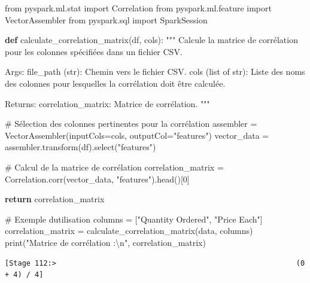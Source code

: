 \documentclass[
  letterpaper,
  DIV=11,
  numbers=noendperiod]{scrartcl}
\newenvironment{Shaded}{\begin{snugshade}}{\end{snugshade}}
\newcommand{\BuiltInTok}[1]{\textcolor[rgb]{0.00,0.23,0.31}{#1}}
\newcommand{\CharTok}[1]{\textcolor[rgb]{0.13,0.47,0.30}{#1}}
\newcommand{\CommentTok}[1]{\textcolor[rgb]{0.37,0.37,0.37}{#1}}
\newcommand{\ControlFlowTok}[1]{\textcolor[rgb]{0.00,0.23,0.31}{\textbf{#1}}}
\newcommand{\DecValTok}[1]{\textcolor[rgb]{0.68,0.00,0.00}{#1}}
\newcommand{\ImportTok}[1]{\textcolor[rgb]{0.00,0.46,0.62}{#1}}
\newcommand{\KeywordTok}[1]{\textcolor[rgb]{0.00,0.23,0.31}{\textbf{#1}}}
\newcommand{\NormalTok}[1]{\textcolor[rgb]{0.00,0.23,0.31}{#1}}
\newcommand{\OperatorTok}[1]{\textcolor[rgb]{0.37,0.37,0.37}{#1}}
\newcommand{\StringTok}[1]{\textcolor[rgb]{0.13,0.47,0.30}{#1}}
\begin{document}
\begin{Shaded}
\begin{Highlighting}[]
\ImportTok{from}\NormalTok{ pyspark.ml.stat }\ImportTok{import}\NormalTok{ Correlation}
\ImportTok{from}\NormalTok{ pyspark.ml.feature }\ImportTok{import}\NormalTok{ VectorAssembler}
\ImportTok{from}\NormalTok{ pyspark.sql }\ImportTok{import}\NormalTok{ SparkSession}

\KeywordTok{def}\NormalTok{ calculate\_correlation\_matrix(df, cols):}
    \CommentTok{"""}
\CommentTok{    Calcule la matrice de corrélation pour les colonnes spécifiées dans un fichier CSV.}

\CommentTok{    Args:}
\CommentTok{    file\_path (str): Chemin vers le fichier CSV.}
\CommentTok{    cols (list of str): Liste des noms des colonnes pour lesquelles la corrélation doit être calculée.}

\CommentTok{    Returns:}
\CommentTok{    correlation\_matrix: Matrice de corrélation.}
\CommentTok{    """}

    \CommentTok{\# Sélection des colonnes pertinentes pour la corrélation}
\NormalTok{    assembler }\OperatorTok{=}\NormalTok{ VectorAssembler(inputCols}\OperatorTok{=}\NormalTok{cols, outputCol}\OperatorTok{=}\StringTok{"features"}\NormalTok{)}
\NormalTok{    vector\_data }\OperatorTok{=}\NormalTok{ assembler.transform(df).select(}\StringTok{"features"}\NormalTok{)}

    \CommentTok{\# Calcul de la matrice de corrélation}
\NormalTok{    correlation\_matrix }\OperatorTok{=}\NormalTok{ Correlation.corr(vector\_data, }\StringTok{"features"}\NormalTok{).head()[}\DecValTok{0}\NormalTok{]}

    \ControlFlowTok{return}\NormalTok{ correlation\_matrix}

\CommentTok{\# Exemple d\textquotesingle{}utilisation}
\NormalTok{columns }\OperatorTok{=}\NormalTok{ [}\StringTok{"Quantity Ordered"}\NormalTok{, }\StringTok{"Price Each"}\NormalTok{]}
\NormalTok{correlation\_matrix }\OperatorTok{=}\NormalTok{ calculate\_correlation\_matrix(data, columns)}
\BuiltInTok{print}\NormalTok{(}\StringTok{"Matrice de corrélation :}\CharTok{\textbackslash{}n}\StringTok{"}\NormalTok{, correlation\_matrix)}
\end{Highlighting}
\end{Shaded}

\begin{verbatim}
[Stage 112:>                                                        (0 + 4) / 4]
\end{verbatim}
\end{document}
